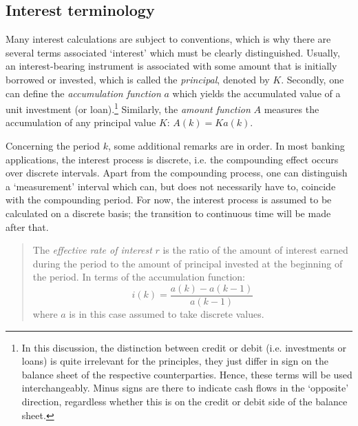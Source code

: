 \subsection{Interest terminology}
Many interest calculations are subject to conventions, which is why there are several terms associated `interest' which must be clearly distinguished. Usually, an interest-bearing instrument is associated with some amount that is initially borrowed or invested, which is called the \emph{principal}, denoted by $K$. Secondly, one can define  the \emph{accumulation function} $a$ which yields the accumulated value of a unit investment (or loan).\footnote{In this discussion, the distinction between credit or debit (i.e. investments or loans) is quite irrelevant for the principles, they just differ in sign on the balance sheet of the respective counterparties. Hence, these terms will be used interchangeably. Minus signs are there to indicate cash flows in the `opposite' direction, regardless whether this is on the credit or debit side of the balance sheet.}
Similarly, the \emph{amount function} $A$ measures the accumulation of any principal value $K$: $A(k) = Ka(k)$. \cite{Kellison1991}

Concerning the period $k$, some additional remarks are in order. In most banking applications, the interest process is discrete, i.e. the compounding effect occurs over discrete intervals. Apart from the compounding process, one can distinguish a `measurement' interval which can, but does not necessarily have to, coincide with the compounding period. For now, the interest process is assumed to be calculated on a discrete basis; the transition to continuous time will be made after that.

\begin{quote}
    The \emph{effective rate of interest} $r$ is the ratio of the amount of interest earned during the period to the amount of principal invested at the beginning of the period. In terms of the accumulation function:
     \begin{equation}
         i(k) = \frac{a(k) - a(k-1)}{a(k-1)}
         \label{eq:effective_interest}
     \end{equation}
     where $a$ is in this case assumed to take discrete values.
\end{quote}

\begin{quote}
    
\end{quote}

